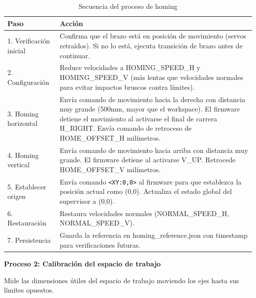 \begin{table}[H]
\centering
\small
\begin{tabular}{|l|p{10cm}|}
\hline
\textbf{Paso} & \textbf{Acción} \\
\hline
1. Verificación inicial & Confirma que el brazo está en posición de movimiento (servos retraídos). Si no lo está, ejecuta transición de brazo antes de continuar. \\
\hline
2. Configuración & Reduce velocidades a HOMING\_SPEED\_H y HOMING\_SPEED\_V (más lentas que velocidades normales para evitar impactos bruscos contra límites). \\
\hline
3. Homing horizontal & Envía comando de movimiento hacia la derecha con distancia muy grande (500mm, mayor que el workspace). El firmware detiene el movimiento al activarse el final de carrera H\_RIGHT. Envía comando de retroceso de HOME\_OFFSET\_H milímetros. \\
\hline
4. Homing vertical & Envía comando de movimiento hacia arriba con distancia muy grande. El firmware detiene al activarse V\_UP. Retrocede HOME\_OFFSET\_V milímetros. \\
\hline
5. Establecer origen & Envía comando \texttt{<XY:0,0>} al firmware para que establezca la posición actual como (0,0). Actualiza el estado global del supervisor a (0,0). \\
\hline
6. Restauración & Restaura velocidades normales (NORMAL\_SPEED\_H, NORMAL\_SPEED\_V). \\
\hline
7. Persistencia & Guarda la referencia en homing\_reference.json con timestamp para verificaciones futuras. \\
\hline
\end{tabular}
\caption{Secuencia del proceso de homing}
\label{tab:proceso_homing}
\end{table}

\textbf{Proceso 2: Calibración del espacio de trabajo}

Mide las dimensiones útiles del espacio de trabajo moviendo los ejes hasta sus límites opuestos.


